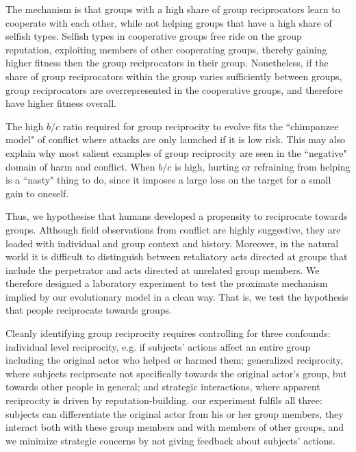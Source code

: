 \documentclass[12pt,a4paper]{article}\usepackage[]{graphicx}\usepackage[]{color}
\begin{document}
The mechanism is that groups with a high share of group reciprocators learn to cooperate with each other, while not helping
groups that have a high share of selfish types. Selfish types in cooperative groups free ride on the group reputation,
exploiting members of other cooperating groups, thereby gaining higher fitness then the group reciprocators in their group.
Nonetheless, if the share of group reciprocators within the group varies sufficiently between groups, group reciprocators 
are overrepresented in the cooperative groups, and therefore have higher fitness overall.

The high $b/c$ ratio required for group reciprocity to evolve fits the ``chimpanzee model" of conflict where attacks are 
only launched if it is low risk. This may also explain why most salient examples of group reciprocity are seen in the
``negative" domain of harm and conflict. When $b/c$ is high, hurting or refraining from helping is a ``nasty" thing to 
do, since it imposes a large loss on the target for a small gain to oneself.

Thus, we hypothesise that humans developed a propensity to reciprocate towards groups. Although field observations from
conflict are highly suggestive, they are loaded with individual and group context and history. Moreover, in the natural 
world it is difficult to distinguish between retaliatory acts directed at groups that include the perpetrator and acts
directed at unrelated group members. We therefore designed a laboratory experiment to test the proximate mechanism implied
by our evolutionary model in a clean way. That is, we test the hypothesis that people reciprocate towards groups.

Cleanly identifying group reciprocity requires controlling for three confounds: individual level reciprocity, e.g. if
subjects' actions affect an entire group including the original actor who helped or harmed them; generalized reciprocity,
where subjects reciprocate not specifically towards the original actor’s group, but towards other people in general; and
strategic interactions, where apparent reciprocity is driven by reputation-building. 
our experiment fulfils all three: subjects can differentiate the original actor from his or her group members, they 
interact both with these group members and with members of other groups, and we minimize strategic concerns by not giving
feedback about subjects' actions.
\end{document}
